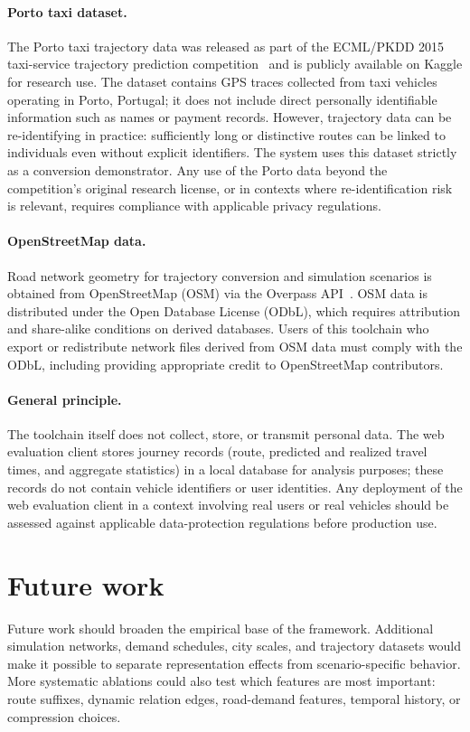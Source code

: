 \paragraph{Porto taxi dataset.}
The Porto taxi trajectory data was released as part of the ECML/PKDD 2015 taxi-service trajectory prediction competition~\cite{porto2015pkdd} and is publicly available on Kaggle for research use. The dataset contains GPS traces collected from taxi vehicles operating in Porto, Portugal; it does not include direct personally identifiable information such as names or payment records. However, trajectory data can be re-identifying in practice: sufficiently long or distinctive routes can be linked to individuals even without explicit identifiers. The system uses this dataset strictly as a conversion demonstrator. Any use of the Porto data beyond the competition's original research license, or in contexts where re-identification risk is relevant, requires compliance with applicable privacy regulations.

\paragraph{OpenStreetMap data.}
Road network geometry for trajectory conversion and simulation scenarios is obtained from OpenStreetMap (OSM) via the Overpass API~\cite{osm}. OSM data is distributed under the Open Database License (ODbL), which requires attribution and share-alike conditions on derived databases. Users of this toolchain who export or redistribute network files derived from OSM data must comply with the ODbL, including providing appropriate credit to OpenStreetMap contributors.

\paragraph{General principle.}
The toolchain itself does not collect, store, or transmit personal data. The web evaluation client stores journey records (route, predicted and realized travel times, and aggregate statistics) in a local database for analysis purposes; these records do not contain vehicle identifiers or user identities. Any deployment of the web evaluation client in a context involving real users or real vehicles should be assessed against applicable data-protection regulations before production use.

\section{Future work}
Future work should broaden the empirical base of the framework. Additional simulation networks, demand schedules, city scales, and trajectory datasets would make it possible to separate representation effects from scenario-specific behavior. More systematic ablations could also test which features are most important: route suffixes, dynamic relation edges, road-demand features, temporal history, or compression choices.

